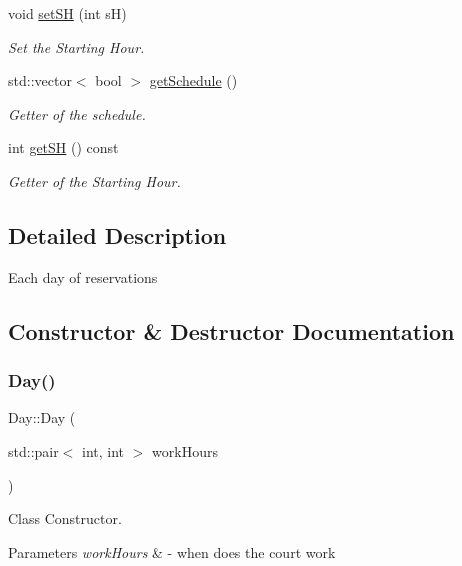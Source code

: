 \begin{DoxyCompactItemize}
void \mbox{\hyperlink{class_day_a6fc6dfeef1c92b9a5395648c4d0c8a70}{set\+SH}} (int sH)
\begin{DoxyCompactList}\small\item\em Set the Starting Hour. \end{DoxyCompactList}\item 
std\+::vector$<$ bool $>$ \mbox{\hyperlink{class_day_a89096a2d290b712108feb7fe3bf7da51}{get\+Schedule}} ()
\begin{DoxyCompactList}\small\item\em Getter of the schedule. \end{DoxyCompactList}\item 
int \mbox{\hyperlink{class_day_ab730d15c19486aa3c45839e8f5990c57}{get\+SH}} () const
\begin{DoxyCompactList}\small\item\em Getter of the Starting Hour. \end{DoxyCompactList}\end{DoxyCompactItemize}


\subsection{Detailed Description}
Each day of reservations 

\subsection{Constructor \& Destructor Documentation}
\mbox{\label{class_day_a0ba7af88eca9b5e6ca197c3d40b3ca66}} 
\subsubsection{\texorpdfstring{Day()}{Day()}}
{\footnotesize\ttfamily Day\+::\+Day (\begin{DoxyParamCaption}\item[{std\+::pair$<$ int, int $>$}]{work\+Hours }\end{DoxyParamCaption})}



Class Constructor. 


\begin{DoxyParams}{Parameters}
{\em work\+Hours} & -\/ when does the court work \\
\hline
\end{DoxyParams}


